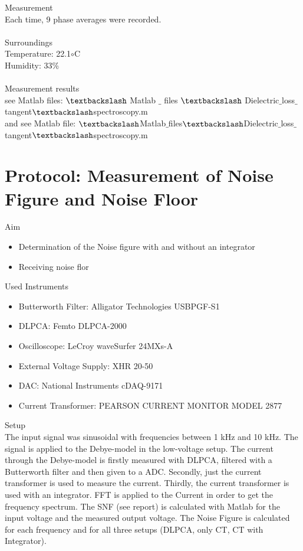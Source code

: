 {\Large Measurement} \\
Each time, 9 phase averages were recorded.\\ 
\\
{\Large  Surroundings} \\
Temperature: 22.1$\circ$C\\
Humidity: 33\%\\
\\
{\Large Measurement results}\\
see Matlab files: $\textbackslash$ Matlab $\_$ files $\textbackslash$ Dielectric$\_$loss$\_$tangent$\textbackslash$spectroscopy.m\\
and see Matlab file: $\textbackslash$Matlab$\_$files$\textbackslash$Dielectric$\_$loss$\_$tangent$\textbackslash$spectroscopy.m


\section{Protocol: Measurement of Noise Figure and Noise Floor}
{\Large Aim}
\begin{itemize}
\item Determination of the Noise figure with and without an integrator 
\item Receiving noise flor 
\end{itemize}
{\Large Used Instruments}
\begin{itemize}
 \item Butterworth Filter: Alligator Technologies USBPGF-S1
 \item DLPCA: Femto DLPCA-2000
 \item Oscilloscope: LeCroy waveSurfer 24MXs-A
 \item External Voltage Supply:  XHR 20-50
 \item DAC: National Instruments cDAQ-9171
 \item Current Transformer: PEARSON CURRENT
MONITOR MODEL 2877
\end{itemize}
{\Large Setup} \\
The input signal was  sinusoidal with frequencies between 1 kHz and 10 kHz. The signal is applied to the Debye-model in the low-voltage setup. The current through the Debye-model is firstly measured with DLPCA, filtered with a Butterworth filter and then given to a ADC. Secondly, just the current transformer is used to measure the current. Thirdly, the current transformer is used with an integrator.  FFT is applied to the Current in order to get the frequency spectrum. The SNF (see report) is calculated with Matlab for the input voltage and the measured output voltage. The Noise Figure is calculated for each frequency and for all three setups (DLPCA, only CT, CT with Integrator).\\
